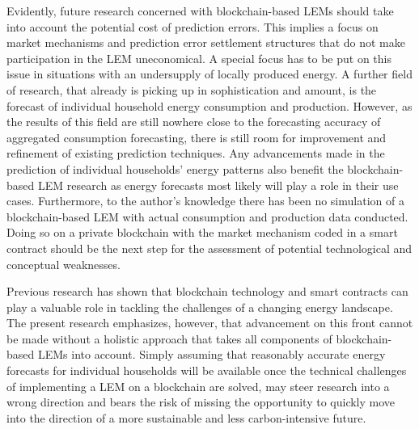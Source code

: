 Evidently, future research concerned with blockchain-based LEMs should take into account the potential cost of prediction errors. This implies a focus on market mechanisms and prediction error settlement structures that do not make participation in the LEM uneconomical. A special focus has to be put on this issue in situations with an undersupply of locally produced energy. A further field of research, that already is picking up in sophistication and amount, is the forecast of individual household energy consumption and production. However, as the results of this field are still nowhere close to the forecasting accuracy of aggregated consumption forecasting, there is still room for improvement and refinement of existing prediction techniques. Any advancements made in the prediction of individual households' energy patterns also benefit the blockchain-based LEM research as energy forecasts most likely will play a role in their use cases. Furthermore, to the author's knowledge there has been no simulation of a blockchain-based LEM with actual consumption and production data conducted. Doing so on a private blockchain with the market mechanism coded in a smart contract should be the next step for the assessment of potential technological and conceptual weaknesses.

Previous research has shown that blockchain technology and smart contracts can play a valuable role in tackling the challenges of a changing energy landscape. The present research emphasizes, however, that advancement on this front cannot be made without a holistic approach that takes all components of blockchain-based LEMs into account. Simply assuming that reasonably accurate energy forecasts for individual households will be available once the technical challenges of implementing a LEM on a blockchain are solved, may steer research into a wrong direction and bears the risk of missing the opportunity to quickly move into the direction of a more sustainable and less carbon-intensive future.


